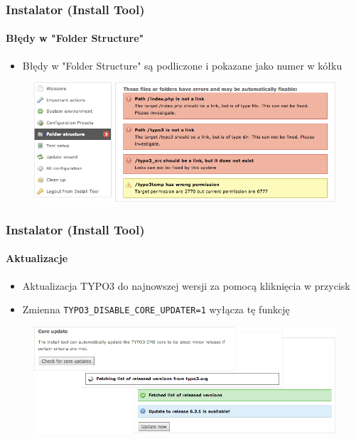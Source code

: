 
\begin{frame}[fragile]
	\frametitle{Instalator (Install Tool)}
	\framesubtitle{Błędy w "Folder Structure"}

	\begin{itemize}
		\item Błędy w "Folder Structure" są podliczone i pokazane jako numer w kółku
	\end{itemize}

	\begin{figure}
		\includegraphics[width=0.95\linewidth]{Images/InstallTool/ErrorsInFolderStructure.png}
	\end{figure}

\end{frame}


\begin{frame}[fragile]
	\frametitle{Instalator (Install Tool)}
	\framesubtitle{Aktualizacje}

	\begin{itemize}
		\item Aktualizacja TYPO3 do najnowszej wersji za pomocą kliknięcia w przycisk 
		\item Zmienna \texttt{TYPO3\_DISABLE\_CORE\_UPDATER=1} wyłącza tę funkcję
	\end{itemize}

	\begin{figure}
		\includegraphics[width=0.95\linewidth]{Images/InstallTool/CoreUpdate.png}
	\end{figure}

\end{frame}

